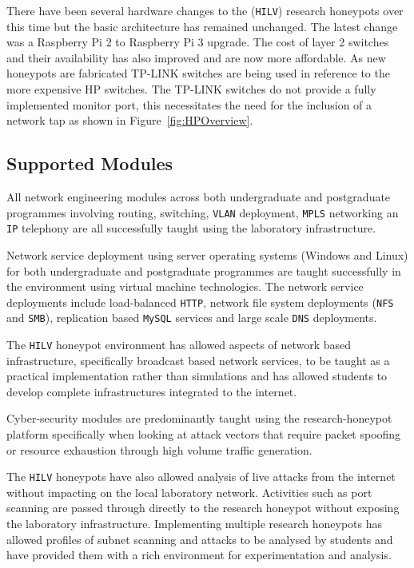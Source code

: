 There have been several hardware changes to the (\texttt{HILV}) research honeypots over this time but the basic architecture has remained unchanged. The latest change was a Raspberry Pi 2 to Raspberry Pi 3 upgrade. The cost of layer 2 switches and their availability has also improved and are now more affordable. As new honeypots are fabricated TP-LINK switches are being used in reference to the more expensive HP switches. The TP-LINK switches do not provide a fully implemented monitor port, this necessitates the need for the inclusion of a network tap as shown in Figure~\ref{fig:HPOverview}.

\subsection{Supported Modules}\label{Modules}

All network engineering modules across both undergraduate and postgraduate programmes involving routing, switching, \texttt{VLAN} deployment, \texttt{MPLS} networking an \texttt{IP} telephony are all successfully taught using the laboratory infrastructure. 

Network service deployment using server operating systems (Windows and Linux) for both undergraduate and postgraduate programmes are taught successfully in the environment using virtual machine technologies. The network service deployments include load-balanced \texttt{HTTP}, network file system deployments (\texttt{NFS} and \texttt{SMB}), replication based \texttt{MySQL} services and large scale \texttt{DNS} deployments.  

The \texttt{HILV} honeypot environment has allowed aspects of network based infrastructure, specifically broadcast based network services, to be taught as a practical implementation rather than simulations and has allowed students to develop complete infrastructures integrated to the internet.

Cyber-security modules are predominantly taught using the research-honeypot platform specifically when looking at attack vectors that require packet spoofing or resource exhaustion through high volume traffic generation.

The \texttt{HILV} honeypots have also allowed analysis of live attacks from the internet without impacting on the local laboratory network. Activities such as port scanning are passed through directly to the research honeypot without exposing the laboratory infrastructure. Implementing multiple research honeypots has allowed profiles of subnet scanning and attacks to be analysed by students and have provided them with a rich environment for experimentation and analysis.    

